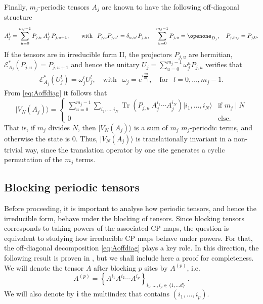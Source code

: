 \documentclass[pra,a4paper,notitlepage,nofootinbib,superscriptaddress]{revtex4-1}
\theoremstyle{plain}
\newcommand{\E}{\mathcal{E}}
\newcommand{\1}{{\openone}}
\newcommand{\be}{\begin{eqnarray}}
\newcommand{\ee}{\end{eqnarray}}
\newcommand{\ra}{\rangle}
\DeclareMathOperator{\tr}{Tr}
\begin{document}
Finally, $m_j$-periodic tensors $A_j$ are known to have \cite{Wo11} the following off-diagonal structure
\be
    A^i_j = \sum_{u=0}^{m_j-1} P_{j,u} \: A^i_j \: P_{j,u+1},
    \qquad \textrm{with }\:\: P_{j,u} P_{j,u'}=\delta_{u,u'}P_{j,u}, \quad \sum_{u=0}^{m_j-1}P_{j,u}=\openone_{D_j}, \quad P_{j,m_j}= P_{j,0}.
    \label{eq:Aoffdiag}
\ee
If the tensors are in irreducible form II, the projectors $P_{j,u}$ are hermitian,
$\E^*_{A_j}(P_{j,u})=P_{j, u+1}$ and hence the unitary $U_j= \sum_{u=0}^{m_j-1} \omega_j^u P_{j,u}$ verifies that
\be\label{eq:peripheral}
    \E^*_{A_j}(U_j^l)=\omega_j^l U_j^l,\quad
    \textrm{with }\:\: \omega_j=e^{i\frac{2\pi }{m_j}},
    \quad \textrm{for }\:\: l=0,\dots, m_j-1.
\ee
From \eqref{eq:Aoffdiag} it follows that
$$
    |V_N(A_j)\ra =
    \begin{cases}
        \sum_{u=0}^{m_j-1} \sum_{i_1,\ldots, i_N}  \tr(P_{j,u} \: A^{i_1}_j \cdots A^{i_N}_j)|i_1,\ldots, i_N\ra & \textrm{if } m_j \mid N\label{eq:VAj} \\
        0                                                                                                        & \textrm{else} .
    \end{cases}
$$
That is, if $m_j$ divides $N$, then $|V_N(A_j)\ra$ is a sum of $m_j$ $m_j$-periodic terms, and otherwise the state is 0.
Thus, $|V_N(A_j)\ra$ is translationally invariant in a non-trivial way, since the translation operator by one site generates a cyclic permutation of the $m_j$ terms.





\subsection{Blocking periodic tensors}
\label{ssec:block}

Before proceeding, it is important to analyse how periodic tensors, and hence the irreducible form, behave under the blocking of tensors.
Since blocking tensors corresponds to taking powers of the associated CP maps, the question is equivalent to studying how irreducible CP maps behave under  powers. For that, the off-diagonal decomposition \eqref{eq:Aoffdiag} plays a key role.
In this direction, the following result is proven in \cite{Ca13b},
but we shall include here a proof  for completeness.
We will denote the tensor $A$ after blocking $p$ sites by $A^{(p)}$, i.e.
$$
    A^{(p)}=\left\{ A^{i_1}A^{i_2}\cdots A^{i_p}  \right\}_{i_1,\ldots, i_p\in \{1,\ldots d\}}\; .
$$
We will also denote by $\mathbf{i}$ the multiindex that contains $(i_1,\ldots, i_p)$.
\end{document}

